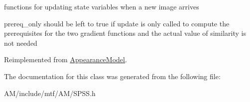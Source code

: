 functions for updating state variables when a new image arrives 

prereq\-\_\-only should be left to true if update is only called to compute the prerequisites for the two gradient functions and the actual value of similarity is not needed 

Reimplemented from \hyperlink{classAppearanceModel_a06136ecd903e85ed2007da2c7b12bd58}{Appearance\-Model}.



The documentation for this class was generated from the following file\-:\begin{DoxyCompactItemize}
\item 
A\-M/include/mtf/\-A\-M/S\-P\-S\-S.\-h\end{DoxyCompactItemize}
